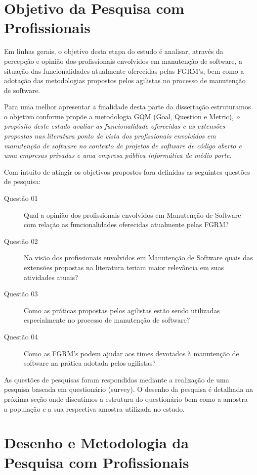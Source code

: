 \section{Objetivo da Pesquisa com Profissionais}
\label{sec:objetivo_da_pesquisa_com_profissionais}
Em linhas gerais, o objetivo desta etapa do estudo é analisar, através da
percepção e opinião dos profissionais envolvidos em manutenção de software, a
situação das funcionalidades atualmente oferecidas pelas FGRM's, bem como
a adotação das metodologias propostos pelos agilistas no processo de manutenção
de software.

Para uma melhor apresentar a finalidade desta parte da dissertação estruturamos
o objetivo conforme propõe a metodologia GQM (Goal, Question e
Metric)\cite{gqm}, \textit{o propósito deste estudo avaliar as funcionalidade
	oferecidas e as extensões propostas nas literatura ponto de
	vista dos profissionais envolvidos em manutenção de software no contexto de
	projetos de software de código aberto e uma empresas privadas e  uma empresa  pública informática de
	médio porte.}

Com intuito de atingir os objetivos propostos fora definidas as seguintes
questões de pesquisa:
\begin{description}
	\item[Questão 01] Qual a opinião dos profissionais envolvidos em Manutenção
		de Software com relação as funcionalidades oferecidas atualmente pelas
		FGRM\@?
	\item[Questão 02] Na visão  dos profissionais envolvidos em Manutenção de
		Software quais das extensões propostas na literatura teriam maior
		relevância em suas atividades atuais?
	\item[Questão 03] Como as práticas propostas pelos agilistas estão sendo
	utilizadas especialmente no processo de manutenção de software?
	\item[Questão 04] Como as FGRM's podem ajudar aos times devotados à manutenção
	de software na prática adotada pelos agilistas?
\end{description}

As questões de pesquisas foram respondidas mediante a realização de uma pesquisa
baseada em questionário (survey). O desenho da pesquisa é detalhada na próxima
seção onde discutimos a estrutura do questionário bem como a amostra a população
e a sua respectiva amostra utilizada no estudo.

\section{Desenho e Metodologia da Pesquisa com Profissionais}
\label{sec:desenho_da_pesquisa_com_profissionais}


